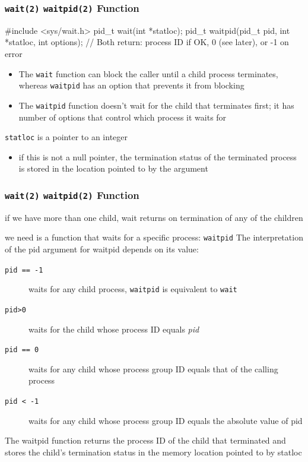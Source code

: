 \documentclass[newPxFont,sthlmFooter,nooffset]{beamer}
\begin{document}
\begin{frame}[containsverbatim,t]
  \frametitle{\texttt{wait(2)} \texttt{waitpid(2)} Function}

\begin{codedef}
#include <sys/wait.h>
pid_t wait(int *statloc);
pid_t waitpid(pid_t pid, int *statloc, int options);
// Both return: process ID if OK, 0 (see later), or -1 on error
\end{codedef}

\begin{itemize}
\item The \texttt{wait} function can block the caller until a child process terminates, whereas \texttt{waitpid} has an option that prevents it from blocking
\item The \texttt{waitpid} function doesn't wait for the child that terminates first; it has number of options that control which process it waits for
\end{itemize}

\texttt{statloc} is a pointer to an integer
\begin{itemize}
\item if this is not a null pointer, the termination status of the terminated process is stored in the location pointed to by the argument
\end{itemize}
\end{frame}

\begin{frame}[containsverbatim,t]
  \frametitle{\texttt{wait(2)} \texttt{waitpid(2)} Function}
if we have more than one child, wait returns on termination of any of the children

we need is a function that waits for a specific process: \texttt{waitpid}
The interpretation of the pid argument for waitpid depends on its value:
\begin{description}
\item [\texttt{pid == -1}] waits for any child process, \texttt{waitpid} is equivalent to \texttt{wait}
\item [\texttt{pid>0}] waits for the child whose process ID equals \textit{pid}
\item[\texttt{pid == 0}] waits for any child whose process group ID equals that of the calling process
\item[\texttt{pid < -1}] waits for any child whose process group ID equals the absolute value of pid
\end{description}

The waitpid function returns the process ID of the child that terminated and stores the child’s termination status in the memory location pointed to by statloc
\end{frame}
\end{document}
